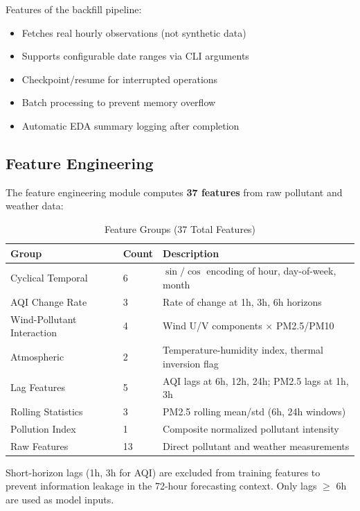 \documentclass[12pt, a4paper, oneside]{article}
\begin{document}
Features of the backfill pipeline:
\begin{itemize}
    \item Fetches real hourly observations (not synthetic data)
    \item Supports configurable date ranges via CLI arguments
    \item Checkpoint/resume for interrupted operations
    \item Batch processing to prevent memory overflow
    \item Automatic EDA summary logging after completion
\end{itemize}

\subsection{Feature Engineering}

The feature engineering module computes \textbf{37 features} from raw pollutant and weather data:

\begin{table}[H]
\centering
\caption{Feature Groups (37 Total Features)}
\label{tab:features}
\begin{tabularx}{\textwidth}{l l X}
\toprule
\textbf{Group} & \textbf{Count} & \textbf{Description} \\
\midrule
Cyclical Temporal & 6 & $\sin/\cos$ encoding of hour, day-of-week, month \\
AQI Change Rate & 3 & Rate of change at 1h, 3h, 6h horizons \\
Wind-Pollutant Interaction & 4 & Wind U/V components $\times$ PM2.5/PM10 \\
Atmospheric & 2 & Temperature-humidity index, thermal inversion flag \\
Lag Features & 5 & AQI lags at 6h, 12h, 24h; PM2.5 lags at 1h, 3h \\
Rolling Statistics & 3 & PM2.5 rolling mean/std (6h, 24h windows) \\
Pollution Index & 1 & Composite normalized pollutant intensity \\
Raw Features & 13 & Direct pollutant and weather measurements \\
\bottomrule
\end{tabularx}
\end{table}

\begin{warnbox}
Short-horizon lags (1h, 3h for AQI) are excluded from training features to prevent information leakage in the 72-hour forecasting context. Only lags $\geq$ 6h are used as model inputs.
\end{warnbox}
\end{document}
